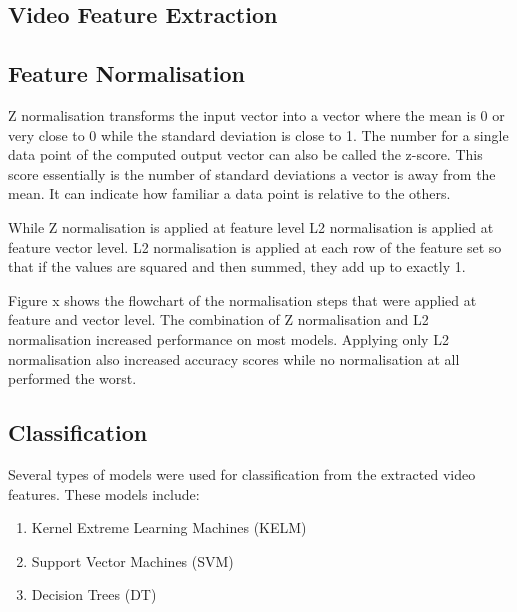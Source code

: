 \subsection{Video Feature Extraction}

\subsection{Feature Normalisation}
Z normalisation transforms the input vector into a vector where the mean is 0 or very close to 0 while the standard deviation is close to 1. The number for a single data point of the computed output vector can also be called the z-score. This score essentially is the number of standard deviations a vector is away from the mean. It can indicate how familiar a data point is relative to the others. 

While Z normalisation is applied at feature level L2 normalisation is applied at feature vector level. L2 normalisation is applied at each row of the feature set so that if the values are squared and then summed, they add up to exactly 1. 

Figure x shows the flowchart of the normalisation steps that were applied at feature and vector level. The combination of Z normalisation and L2 normalisation increased performance on most models. Applying only L2 normalisation also increased accuracy scores while no normalisation at all performed the worst. 

\subsection{Classification}
Several types of models were used for classification from the extracted video features. These models include:
\begin{enumerate}
\item Kernel Extreme Learning Machines (KELM)
\item Support Vector Machines (SVM)
\item Decision Trees (DT)
\end{enumerate}





